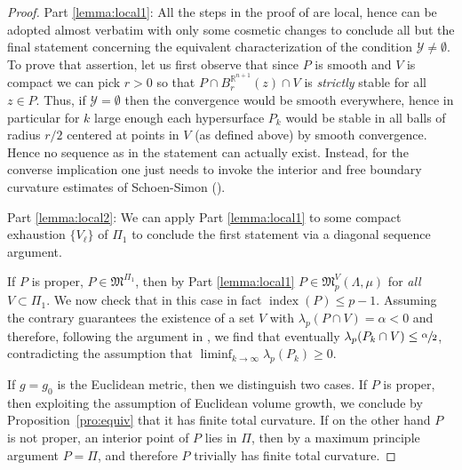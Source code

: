 \documentclass[JEP,XML,SOM,Unicode]{cedram}
\let\mathcal\mathscr
\newcounter{cas}
\DeclareMathOperator{\indx}{index}
\theoremstyle{definition}
\newcommand{\R}{\mathbb{R}}
\begin{document}
\begin{proof}
Part \eqref{lemma:local1}: All the steps in the proof of \cite[Th.\,29]{ACS17} are local, hence can be adopted almost verbatim with only some cosmetic changes to conclude all but the final statement concerning the equivalent characterization of the condition $\mathcal{Y}\neq\emptyset$. To prove that assertion, let us first observe that since $P$ is smooth and $V$ is compact we can pick $r>0$ so that $P\cap B^{\R^{n+1}}_r(z)\cap V$ is \emph{strictly} stable for all $z\in P$. Thus, if $\mathcal{Y}=\emptyset$ then the convergence would be smooth everywhere, hence in particular for $k$ large enough each hypersurface $P_k$ would be stable in all balls of radius $r/2$ centered at points in $V$ (as defined above) by smooth convergence. Hence no sequence as in the statement can actually exist. Instead, for the converse implication one just needs to invoke the interior and free boundary curvature estimates of Schoen-Simon \cite{SS81} (\cf \cite[Th.\,19]{ACS17}).

Part \eqref{lemma:local2}:
We can apply Part \eqref{lemma:local1} to some compact exhaustion $\{V_{\ell}\}$ of $\Pi_1$ to conclude the first statement via a diagonal sequence argument.

If $P$ is proper, \ie $P \in \mathfrak{M}^{\Pi_1}$, then by Part \eqref{lemma:local1} $P\in \mathfrak{M}^V_p(\Lambda, \mu)$ for \emph{all} $V \subset \Pi_1$. We now check that in this case in fact $\indx(P)\leq p-1$. Assuming the contrary guarantees the existence of a set $V$ with $\lambda_p(P\cap V)=\alpha<0$ and therefore, following the argument in \cite[p.\,2599--2600]{ACS15}, we find that eventually $\lambda_p(P_k\cap V)\leq \sfrac{\alpha}{2}$, contradicting the assumption that $\liminf_{k\to\infty}\lambda_p(P_k)\geq 0$.

If $g=g_0$ is the Euclidean metric, then we distinguish two cases. If $P$ is proper, then exploiting the assumption of Euclidean volume growth, we conclude by Proposition~\ref{pro:equiv} that it has finite total curvature. If on the other hand $P$ is not proper, \ie an interior point of $P$ lies in $\Pi$, then by a maximum principle argument $P=\Pi$, and therefore $P$ trivially has finite total curvature.


\end{proof}
\end{document}
